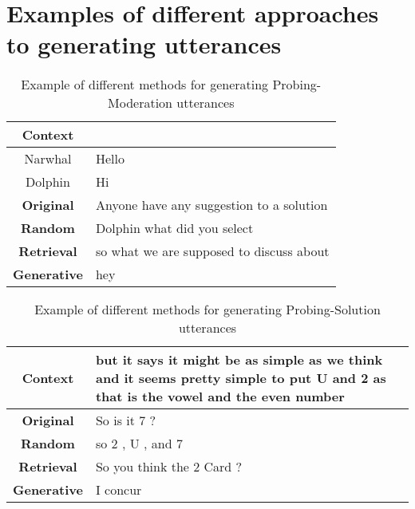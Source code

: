 \documentclass[acmsmall,manuscript,screen]{acmart}
\begin{document}
\clearpage
\section{Examples of different approaches to generating utterances}
\label{app:example_NLG}

\begin{table}[h!]
    \centering
    \begin{tabular}{|c|l|}
        \hline
        \textbf{Context} & \\ \hline 
        Narwhal & Hello \\ \hline
        Dolphin & Hi \\ \hline
         \textbf{Original} & Anyone have any suggestion to a solution \\ \hline
         \textbf{Random} & Dolphin what did you select \\ \hline
         \textbf{Retrieval} & so what we are supposed to discuss about \\ \hline
         \textbf{Generative} & hey \\ \hline
    \end{tabular}
    \caption{Example of different methods for generating Probing-Moderation utterances}
    \label{tab:generative_example_moderation}
\end{table}

\begin{table}[h!]
    \centering
    \begin{tabular}{|c|l|}
        \hline
        \textbf{Context} & \multicolumn{1}{|p{12cm}|}{ but it says it might be as simple as we think and it seems pretty simple to put U and 2 as that is the vowel and the even number} \\ \hline
         \textbf{Original} & So is it 7 ? \\ \hline
         \textbf{Random} & so 2 , U , and 7\\ \hline
         \textbf{Retrieval} & So you think the 2 Card ? \\ \hline
         \textbf{Generative} & \multicolumn{1}{|p{12cm}|}{I concur} \\ \hline
    \end{tabular}
    \caption{Example of different methods for generating Probing-Solution utterances}
    \label{tab:generative_example_solution}
\end{table}




\clearpage
\end{document}
